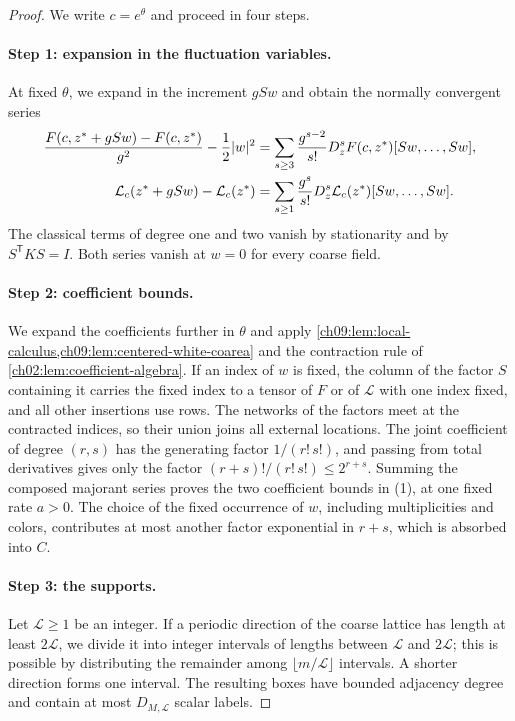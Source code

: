 \begin{proof}
We write $c=e^\theta$ and proceed in four steps.

\paragraph{Step 1: expansion in the fluctuation variables.}
At fixed $\theta$, we expand in the increment $gSw$ and obtain the normally convergent series
\begin{align}
 \frac{F(c,z^*+gSw)-F(c,z^*)}{g^2}-\frac12\lvert w\rvert^2&=\sum_{s\ge3}\frac{g^{s-2}}{s!}D_z^sF(c,z^*)[Sw,\ldots,Sw],\label{ch09:eq:classical-remainder}\\
 \mathcal L_c(z^*+gSw)-\mathcal L_c(z^*)&=\sum_{s\ge1}\frac{g^s}{s!}D_z^s\mathcal L_c(z^*)[Sw,\ldots,Sw].\label{ch09:eq:coarea-remainder}
\end{align}
The classical terms of degree one and two vanish by stationarity and by $S^{\mathsf T}KS=I$. Both series vanish at $w=0$ for every coarse field.

\paragraph{Step 2: coefficient bounds.}
We expand the coefficients further in $\theta$ and apply \cref{ch09:lem:local-calculus,ch09:lem:centered-white-coarea} and the contraction rule of \cref{ch02:lem:coefficient-algebra}. If an index of $w$ is fixed, the column of the factor $S$ containing it carries the fixed index to a tensor of $F$ or of $\mathcal L$ with one index fixed, and all other insertions use rows. The networks of the factors meet at the contracted indices, so their union joins all external locations. The joint coefficient of degree $(r,s)$ has the generating factor $1/(r!\,s!)$, and passing from total derivatives gives only the factor $(r+s)!/(r!\,s!)\le2^{r+s}$. Summing the composed majorant series proves the two coefficient bounds in (1), at one fixed rate $a>0$. The choice of the fixed occurrence of $w$, including multiplicities and colors, contributes at most another factor exponential in $r+s$, which is absorbed into $C$.

\paragraph{Step 3: the supports.}
Let $\mathscr L\ge1$ be an integer. If a periodic direction of the coarse lattice has length at least $2\mathscr L$, we divide it into integer intervals of lengths between $\mathscr L$ and $2\mathscr L$; this is possible by distributing the remainder among $\lfloor m/\mathscr L\rfloor$ intervals. A shorter direction forms one interval. The resulting boxes have bounded adjacency degree and contain at most $D_{M,\mathscr L}$ scalar labels.


\end{proof}

